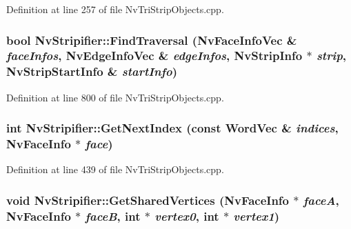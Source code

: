 Definition at line 257 of file NvTriStripObjects.cpp.\hypertarget{class_nv_stripifier_6102543c9d36dc8eccf056ce63303e90}{
\subsubsection[{FindTraversal}]{\setlength{\rightskip}{0pt plus 5cm}bool NvStripifier::FindTraversal ({\bf NvFaceInfoVec} \& {\em faceInfos}, \/  {\bf NvEdgeInfoVec} \& {\em edgeInfos}, \/  {\bf NvStripInfo} $\ast$ {\em strip}, \/  {\bf NvStripStartInfo} \& {\em startInfo})}}
\label{class_nv_stripifier_6102543c9d36dc8eccf056ce63303e90}




Definition at line 800 of file NvTriStripObjects.cpp.\hypertarget{class_nv_stripifier_fb2b61dc693b71abfc224838a6a8e9f6}{
\subsubsection[{GetNextIndex}]{\setlength{\rightskip}{0pt plus 5cm}int NvStripifier::GetNextIndex (const {\bf WordVec} \& {\em indices}, \/  {\bf NvFaceInfo} $\ast$ {\em face})}}
\label{class_nv_stripifier_fb2b61dc693b71abfc224838a6a8e9f6}




Definition at line 439 of file NvTriStripObjects.cpp.\hypertarget{class_nv_stripifier_ada5b25b94422d7d10d0b79fe7448081}{
\subsubsection[{GetSharedVertices}]{\setlength{\rightskip}{0pt plus 5cm}void NvStripifier::GetSharedVertices ({\bf NvFaceInfo} $\ast$ {\em faceA}, \/  {\bf NvFaceInfo} $\ast$ {\em faceB}, \/  int $\ast$ {\em vertex0}, \/  int $\ast$ {\em vertex1})}}
\label{class_nv_stripifier_ada5b25b94422d7d10d0b79fe7448081}




